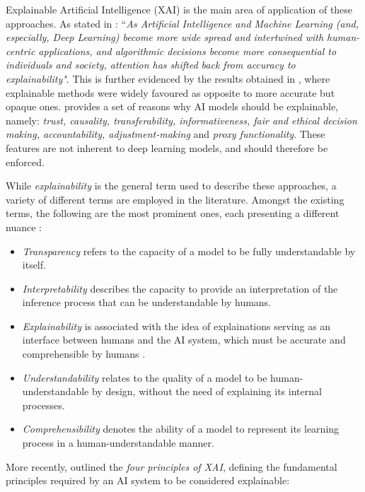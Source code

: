 Explainable Artificial Intelligence (XAI) is the main area of application of these approaches. As stated in \cite{angelov_explainable_2021}: ``\textit{As Artificial Intelligence and Machine Learning (and, especially, Deep Learning) become more wide spread and intertwined with human-centric applications, and algorithmic decisions become more consequential to individuals and society, attention has shifted back from accuracy to explainability"}. This is further evidenced by the results obtained in \cite{amador_systematic_review_2019}, where explainable methods were widely favoured as opposite to more accurate but opaque ones. \cite{burkart_survey_2021} provides a set of reasons why AI models should be explainable, namely: \textit{trust, causality, transferability, informativeness, fair and ethical decision making, accountability, adjustment-making} and \textit{proxy functionality}. These features are not inherent to deep learning models, and should therefore be enforced.

While \textit{explainability} is the general term used to describe these approaches, a variety of different terms are employed in the literature. Amongst the existing terms, the following are the most prominent ones, each presenting a different nuance \citep{barredo_arrieta_explainable_2020,adadi_explainability_2018,gilpin_explainability_2018}:
\begin{itemize}
    \item \textit{Transparency} refers to the capacity of a model to be fully understandable by itself.
    \item \textit{Interpretability} describes the capacity to provide an interpretation of the inference process that can be understandable by humans. 
    \item \textit{Explainability} is associated with the idea of explainations serving as an interface between humans and the AI system, which must be accurate and comprehensible by humans \citep{guidotti_explainability_2018}.
    \item \textit{Understandability} relates to the quality of a model to be human-understandable by design, without the need of explaining its internal processes.
    \item \textit{Comprehensibility} denotes the ability of a model to represent its learning process in a human-understandable manner.
\end{itemize}

More recently, \cite{phillips_explainability_2021} outlined the \textit{four principles of XAI}, defining the fundamental principles required by an AI system to be considered explainable:

